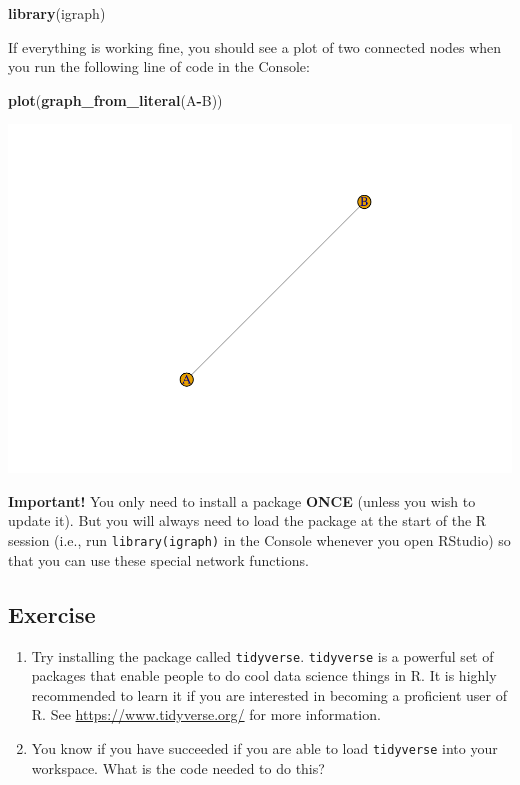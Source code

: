 \documentclass[
]{book}
\newenvironment{Shaded}{\begin{snugshade}}{\end{snugshade}}
\newcommand{\FunctionTok}[1]{\textcolor[rgb]{0.13,0.29,0.53}{\textbf{#1}}}
\newcommand{\NormalTok}[1]{#1}
\newcommand{\SpecialCharTok}[1]{\textcolor[rgb]{0.81,0.36,0.00}{\textbf{#1}}}
\begin{document}
\begin{Shaded}
\begin{Highlighting}[]
\FunctionTok{library}\NormalTok{(igraph)}
\end{Highlighting}
\end{Shaded}

If everything is working fine, you should see a plot of two connected nodes when you run the following line of code in the Console:

\begin{Shaded}
\begin{Highlighting}[]
\FunctionTok{plot}\NormalTok{(}\FunctionTok{graph\_from\_literal}\NormalTok{(A}\SpecialCharTok{{-}}\NormalTok{B))}
\end{Highlighting}
\end{Shaded}

\includegraphics{bookdown-demo_files/figure-latex/unnamed-chunk-3-1.pdf}

\textbf{Important!} You only need to install a package \textbf{ONCE} (unless you wish to update it). But you will always need to load the package at the start of the R session (i.e., run \texttt{library(igraph)} in the Console whenever you open RStudio) so that you can use these special network functions.

\subsection{Exercise}\label{exercise}

\begin{enumerate}
\def\labelenumi{\arabic{enumi}.}
\item
  Try installing the package called \texttt{tidyverse}. \texttt{tidyverse} is a powerful set of packages that enable people to do cool data science things in R. It is highly recommended to learn it if you are interested in becoming a proficient user of R. See \url{https://www.tidyverse.org/} for more information.
\item
  You know if you have succeeded if you are able to load \texttt{tidyverse} into your workspace. What is the code needed to do this?
\end{enumerate}
\end{document}
